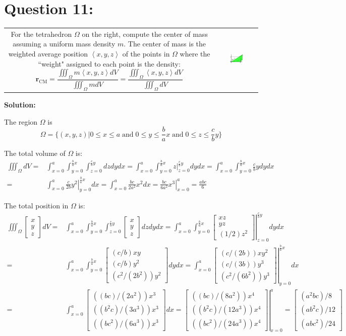 \documentclass{article}
\newcommand{\rowvec}[3]{\left\langle #1, #2, #3 \right\rangle}
\newcommand{\colvec}[3]{\begin{bmatrix} #1 \\ #2 \\ #3 \end{bmatrix}}
\newcommand{\at}[1]{\left. #1 \right|}
\newcommand{\dr}[1]{\textcolor{dark_red}{#1}}
\begin{document}
\section*{Question 11:}

\begin{tabular}{cc}
\parbox{0.6\textwidth}{For the tetrahedron \(\Omega\) on the right, compute the center of mass assuming a uniform mass density \(m\). The center of mass is the weighted average position \(\rowvec{x}{y}{z}\) of the points in \(\Omega\) where the ``weight" assigned to each point is the density: \[\mathbf{r}_{\text{CM}} = \frac{\iiint_{\Omega} m\rowvec{x}{y}{z}dV}{\iiint_{\Omega} mdV} = \frac{\iiint_{\Omega} \rowvec{x}{y}{z}dV}{\iiint_{\Omega} dV}\]} 
&
\parbox{0.4\textwidth}{\includegraphics[width = 0.4\textwidth]{Test_bench_part_3_images/Test_bench_part_3_image_4}}
\end{tabular}

\vspace{5mm}
\dr{\textbf{Solution:}}

\dr{The region \(\Omega\) is 
\[\Omega = \{(x,y,z) | 0 \leq x \leq a \;\text{and}\; 0 \leq y \leq \frac{b}{a}x \;\text{and}\; 0 \leq z \leq \frac{c}{b}y\}\]
}

\dr{The total volume of \(\Omega\) is:
\begin{align*}
\iiint_{\Omega} dV = & \int_{x = 0}^a \int_{y = 0}^{\frac{b}{a}x} \int_{z = 0}^{\frac{c}{b}y} dzdydx 
= \int_{x = 0}^a \int_{y = 0}^{\frac{b}{a}x} \at{z}_{z = 0}^{\frac{c}{b}y}dydx 
= \int_{x = 0}^a \int_{y = 0}^{\frac{b}{a}x} \frac{c}{b}ydydx \\
= & \int_{x = 0}^a \at{\frac{c}{2b}y^2}_{y = 0}^{\frac{b}{a}x}dx 
= \int_{x = 0}^a \frac{bc}{2a^2}x^2dx 
= \at{\frac{bc}{6a^2}x^3}_{x = 0}^a
= \frac{abc}{6}
\end{align*}
}

\dr{The total position in \(\Omega\) is:
\begin{align*}
\iiint_{\Omega} \colvec{x}{y}{z}dV = & \int_{x = 0}^a \int_{y = 0}^{\frac{b}{a}x} \int_{z = 0}^{\frac{c}{b}y} \colvec{x}{y}{z}dzdydx 
= \int_{x = 0}^a \int_{y = 0}^{\frac{b}{a}x} \at{\colvec{xz}{yz}{(1/2)z^2}}_{z = 0}^{\frac{c}{b}y}dydx \\
= & \int_{x = 0}^a \int_{y = 0}^{\frac{b}{a}x} \colvec{(c/b)xy}{(c/b)y^2}{(c^2/(2b^2))y^2}dydx 
= \int_{x = 0}^a \at{\colvec{(c/(2b))xy^2}{(c/(3b))y^3}{(c^2/(6b^2))y^3}}_{y = 0}^{\frac{b}{a}x}dx \\
= & \int_{x = 0}^a \colvec{((bc)/(2a^2))x^3}{((b^2c)/(3a^3))x^3}{((bc^2)/(6a^3))x^3}dx 
= \at{\colvec{((bc)/(8a^2))x^4}{((b^2c)/(12a^3))x^4}{((bc^2)/(24a^3))x^4}}_{x = 0}^a 
= \colvec{(a^2bc)/8}{(ab^2c)/12}{(abc^2)/24}
\end{align*}
}
\end{document}
